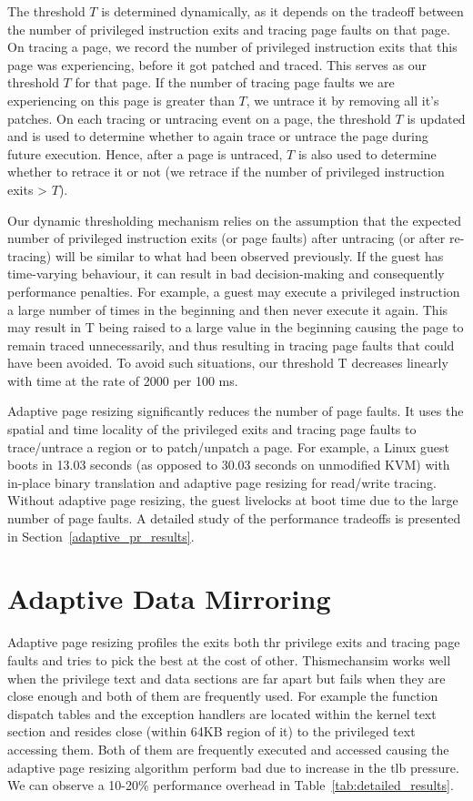 The threshold $T$ is determined dynamically, as it depends on the tradeoff between the number of privileged instruction exits and tracing  page faults on that page. On tracing a page, we record the number of privileged instruction exits that this page was experiencing, before it got patched and traced. This serves as our threshold $T$ for that page. If the number of tracing page faults we are experiencing on this page is greater than $T$, we untrace it by removing all it's patches. On each tracing or untracing event on a page, the threshold $T$ is updated and is used to determine whether to again trace or untrace the page during future execution. Hence, after a page is untraced, $T$ is also used to determine whether to retrace it or not (we retrace if the number of privileged instruction exits > $T$).

Our dynamic thresholding mechanism relies on the assumption that the expected number of privileged instruction exits (or page faults) after  untracing (or after re-tracing) will be similar to what had been observed previously. If the guest has time-varying behaviour, it can result in bad decision-making and consequently performance penalties. For example, a guest may execute a privileged instruction a large number of times in the beginning and then never execute it again. This may result in T being raised to a large value in the beginning causing the page to remain traced unnecessarily, and thus resulting in tracing page faults that could have been avoided. To avoid such situations, our threshold T decreases linearly with time at the rate of 2000 per 100 ms. 

Adaptive page resizing significantly reduces the number of page faults. It uses the spatial and time locality of the privileged exits and tracing page faults to trace/untrace a region or to patch/unpatch a page. For example, a Linux guest boots in 13.03 seconds (as opposed to 30.03 seconds on unmodified KVM) with in-place binary translation and adaptive page resizing for read/write tracing. Without adaptive page resizing, the guest livelocks at boot time due to the large number of page faults. A detailed study of the performance tradeoffs is presented in Section~\ref{adaptive_pr_results}.

\section{Adaptive Data Mirroring}
\label{adaptive_dm}
Adaptive page resizing profiles the exits both thr privilege exits and tracing page faults and tries to pick the best at the cost of other. Thismechansim works well when the privilege text and data sections are far apart but fails when they are close enough and both of them are frequently used. For example the function dispatch tables and the exception handlers are located within the kernel text section and resides close (within 64KB region of it) to the privileged text accessing them. Both of them are frequently executed and accessed causing the adaptive page resizing algorithm perform bad due to increase in the tlb pressure. We can observe a 10-20\% performance overhead in Table~\ref{tab:detailed_results}. 

